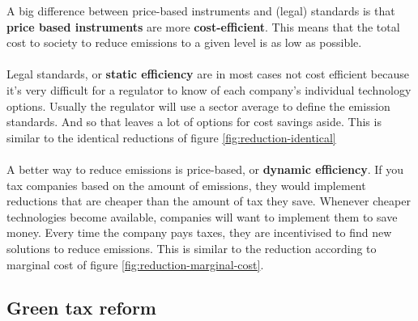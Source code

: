 \documentclass[../summary.tex]{subfiles}
\begin{document}
A big difference between price-based instruments and (legal) standards is that \textbf{price based instruments} are more \textbf{cost-efficient}. This means that the total cost to society to reduce emissions to a given level is as low as possible.
\\\\
Legal standards, or \textbf{static efficiency} are in most cases not cost efficient because it's very difficult for a regulator to know of each company's individual technology options. Usually the regulator will use a sector average to define the emission standards. And so that leaves a lot of options for cost savings aside. This is similar to the identical reductions of figure \ref{fig:reduction-identical}
\\\\
A better way to reduce emissions is price-based, or \textbf{dynamic efficiency}. If you tax companies based on the amount of emissions, they would implement reductions that are cheaper than the amount of tax they save. Whenever cheaper technologies become available, companies will want to implement them to save money. Every time the company pays taxes, they are incentivised to find new solutions to reduce emissions. This is similar to the reduction according to marginal cost of figure \ref{fig:reduction-marginal-cost}.

\subsection{Green tax reform}
\end{document}

